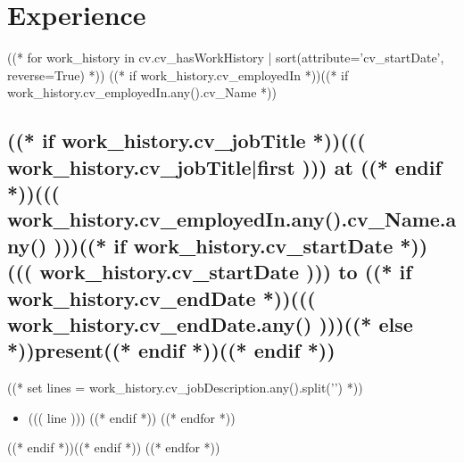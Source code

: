 \documentclass[10pt]{article}
\begin{document}
\section*{Experience}
((* for work_history in cv.cv_hasWorkHistory | sort(attribute='cv_startDate', reverse=True) *))
((* if work_history.cv_employedIn *))((* if work_history.cv_employedIn.any().cv_Name *))
\subsection*{((* if work_history.cv_jobTitle *))((( work_history.cv_jobTitle|first ))) at ((* endif *))((( work_history.cv_employedIn.any().cv_Name.any() )))((* if work_history.cv_startDate *)) \hfill ((( work_history.cv_startDate ))) to ((* if work_history.cv_endDate *))((( work_history.cv_endDate.any() )))((* else *))present((* endif *))((* endif *))}
((* set lines = work_history.cv_jobDescription.any().split('\n\n') *))
\begin{itemize}
((* for line in lines *))
((* if line *))
    \item ((( line )))
((* endif *))
((* endfor *))
\end{itemize}
((* endif *))((* endif *))
((* endfor *))

\end{document}

